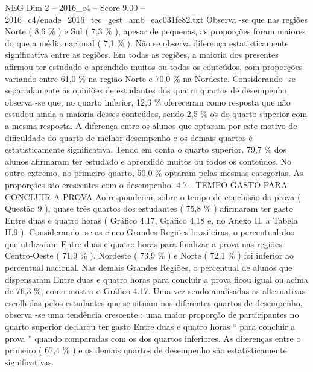 \begin{textsample}{NEG Dim 2 – 2016\_c4 – Score 9.00 – 2016\_c4/enade\_2016\_tec\_gest\_amb\_eac031fe82.txt}
Observa -se que nas regiões Norte ( 8,6 \% ) e Sul ( 7,3 \% ), apesar de pequenas, as proporções foram maiores do que a média nacional ( 7,1 \% ).
Não se observa diferença estatisticamente significativa entre as regiões.
Em todas as regiões, a maioria dos presentes afirmou ter estudado e aprendido muitos ou todos os conteúdos, com proporções variando entre 61,0 \% na região Norte e 70,0 \% na Nordeste.
Considerando -se separadamente as opiniões de estudantes dos quatro quartos de desempenho, observa -se que, no quarto inferior, 12,3 \% ofereceram como resposta que não estudou ainda a maioria desses conteúdos, sendo 2,5 \% os do quarto superior com a mesma resposta.
A diferença entre os alunos que optaram por este motivo de dificuldade do quarto de melhor desempenho e os demais quartos é estatisticamente significativa.
Tendo em conta o quarto superior, 79,7 \% dos alunos afirmaram ter estudado e aprendido muitos ou todos os conteúdos.
No outro extremo, no primeiro quarto, 50,0 \% optaram pelas mesmas categorias.
As proporções são crescentes com o desempenho. 4.7 - TEMPO GASTO PARA CONCLUIR A PROVA Ao responderem sobre o tempo de conclusão da prova ( Questão 9 ), quase três quartos dos estudantes ( 75,8 \% ) afirmaram ter gasto Entre duas e quatro horas ( Gráfico 4.17, Gráfico 4.18 e, no Anexo II, a Tabela II.9 ).
Considerando -se as cinco Grandes Regiões brasileiras, o percentual dos que utilizaram Entre duas e quatro horas para finalizar a prova nas regiões Centro-Oeste ( 71,9 \% ), Nordeste ( 73,9 \% ) e Norte ( 72,1 \% ) foi inferior ao percentual nacional.
Nas demais Grandes Regiões, o percentual de alunos que dispensaram Entre duas e quatro horas para concluir a prova ficou igual ou acima de 76,3 \%, como mostra o Gráfico 4.17.
Uma vez sendo analisadas as alternativas escolhidas pelos estudantes que se situam nos diferentes quartos de desempenho, observa -se uma tendência crescente : uma maior proporção de participantes no quarto superior declarou ter gasto Entre duas e quatro horas “ para concluir a prova ” quando comparadas com os dos quartos inferiores.
As diferenças entre o primeiro ( 67,4 \% ) e os demais quartos de desempenho são estatisticamente significativas.

\end{textsample}
